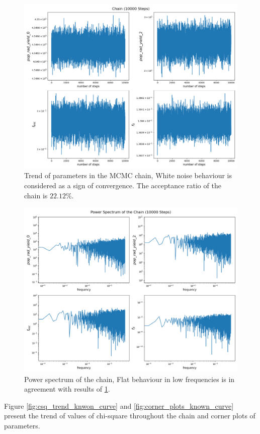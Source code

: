 \documentclass[12pt, TexShade, letterpaper]{report}
\begin{document}
\begin{figure}[h!]
\centering
\includegraphics[scale =0.5]{chain_edges.png}
\caption[Trend of parameters]{Trend of parameters in the MCMC chain, White noise behaviour is considered as a sign of convergence. The acceptance ratio of the chain is $22.12\%.$}
\label{fig:chain_known_curve}
\end{figure}

\begin{figure}[h!]
\centering
\includegraphics[scale =0.5]{power_spectrum_edges.png}
\caption[Power spectrum of the chain]{Power spectrum of the chain, Flat behaviour in low frequencies is in agreement with results of \ref{fig:chain_known_curve}.}
\label{fig:power_spectrum_known_curve}
\end{figure}
Figure \ref{fig:csq_trend_knwon_curve} and \ref{fig:corner_plots_known_curve} present the trend of values of chi-square throughout the chain and corner plots of parameters.\par
\end{document}
